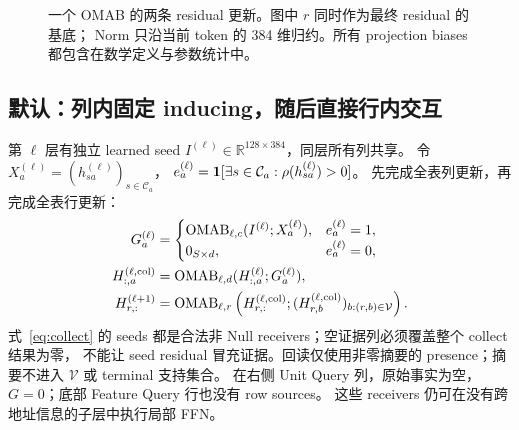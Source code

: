 \documentclass[11pt,UTF8,fontset=fandol]{ctexart}
\newcommand{\R}{\mathbb R}\newcommand{\V}{\mathcal V}\newcommand{\Q}{\mathcal Q}
\begin{document}
\begin{figure}[htbp]\centering
{}
\caption{一个 OMAB 的两条 residual 更新。图中 $r$ 同时作为最终 residual 的基底；
Norm 只沿当前 token 的 384 维归约。所有 projection biases 都包含在数学定义与参数统计中。}
\label{fig:omab}
\end{figure}

\subsection{默认：列内固定 inducing，随后直接行内交互}
第 $\ell$ 层有独立 learned seed $I^{(\ell)}\in\R^{128\times384}$，同层所有列共享。
令 $X_a^{(\ell)}=(h_{sa}^{(\ell)})_{s\in\mathcal C_a}$，
$e_a^{(\ell)}=\mathbf 1[\exists s\in\mathcal C_a:\rho(h_{sa}^{(\ell)})>0]$。
先完成全表列更新，再完成全表行更新：
\begin{align}
 G_a^{(\ell)}&=\begin{cases}
 \OMAB_{\ell,c}(I^{(\ell)};X_a^{(\ell)}),&e_a^{(\ell)}=1,\\
 0_{S\times d},&e_a^{(\ell)}=0,
 \end{cases}\label{eq:collect}\\
 H^{(\ell,\rm col)}_{:,a}&=\OMAB_{\ell,d}(H^{(\ell)}_{:,a};G_a^{(\ell)}),\label{eq:read}\\
 H^{(\ell+1)}_{r,:}&=\OMAB_{\ell,r}
 \left(H^{(\ell,\rm col)}_{r,:};(H^{(\ell,\rm col)}_{r,b})_{b:(r,b)\in\V}\right).
 \label{eq:row}
\end{align}
式~\eqref{eq:collect} 的 seeds 都是合法非 Null receivers；空证据列必须覆盖整个 collect 结果为零，
不能让 seed residual 冒充证据。回读仅使用非零摘要的 presence；摘要不进入 $\V$ 或 terminal 支持集合。
在右侧 Unit Query 列，原始事实为空，$G=0$；底部 Feature Query 行也没有 row sources。
这些 receivers 仍可在没有跨地址信息的子层中执行局部 FFN。
\end{document}
